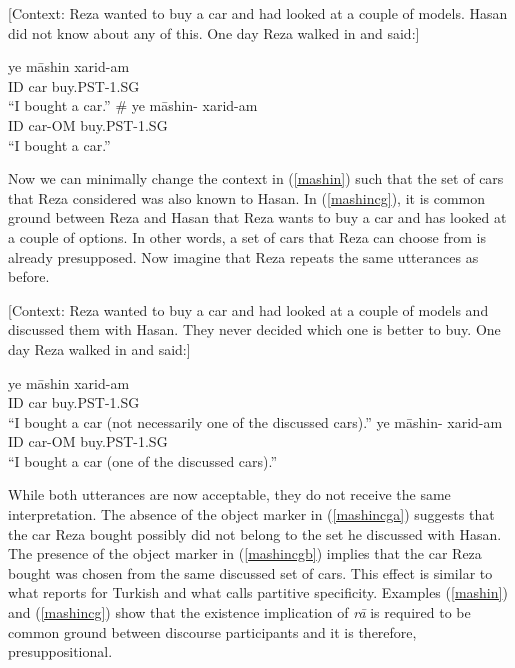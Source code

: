 \documentclass[12pt]{article}
\begin{document}
	\begin {exe}
		\ex \label {mashin}{[\footnotesize Context: Reza wanted to buy a car and had looked at a couple of models. Hasan did not know about any of this. One day Reza walked in and said:]}
		\begin {xlist}
		\ex \label{mashina} \gll	ye 	m\={a}shin	xarid-am\\
			{\scriptsize ID} car	buy{\scriptsize .PST-1.SG}\\
			``I bought a car.''
		\ex \label{mashinb} \gll	\# ye 	m\={a}shin-	xarid-am\\
			{} {\scriptsize ID} car-{\scriptsize OM}	buy{\scriptsize .PST-1.SG}\\
			``I bought a car.''
		\end {xlist}
	\end {exe}

Now we can minimally change the context in (\ref{mashin}) such that the set of cars that Reza considered was also known to Hasan. In (\ref{mashincg}), it is common ground between Reza and Hasan that Reza wants to buy a car and has looked at a couple of options. In other words, a set of cars that Reza can choose from is already presupposed. Now imagine that Reza repeats the same utterances as before.

	\begin {exe}
		\ex \label {mashincg} {[\footnotesize Context: Reza wanted to buy a car and had looked at a couple of models and discussed them with Hasan. They never decided which one is better to buy. One day Reza walked in and said:]}
		\begin {xlist}
		\ex \label{mashincga} \gll	ye 	m\={a}shin	xarid-am\\
			{\scriptsize ID} car	buy{\scriptsize .PST-1.SG}\\
			``I bought a car (not necessarily one of the discussed cars).''
		\ex \label{mashincgb} \gll ye 	m\={a}shin-	xarid-am\\
			{\scriptsize ID} car-{\scriptsize OM}	buy{\scriptsize .PST-1.SG}\\
			``I bought a car (one of the discussed cars).''
		\end {xlist}
	\end {exe}

While both utterances are now acceptable, they do not receive the same interpretation. The absence of the object marker in (\ref{mashincga}) suggests that the car Reza bought possibly did not belong to the set he discussed with Hasan. The presence of the object marker in (\ref{mashincgb}) implies that the car Reza bought was chosen from the same discussed set of cars. This effect is similar to what \cite{encc1991semantics} reports for Turkish and what \cite{farkas1994specificity} calls partitive specificity. Examples (\ref{mashin}) and (\ref{mashincg}) show that the existence implication of \emph{r\={a}} is required to be common ground between discourse participants and it is therefore, presuppositional.
\end{document}
